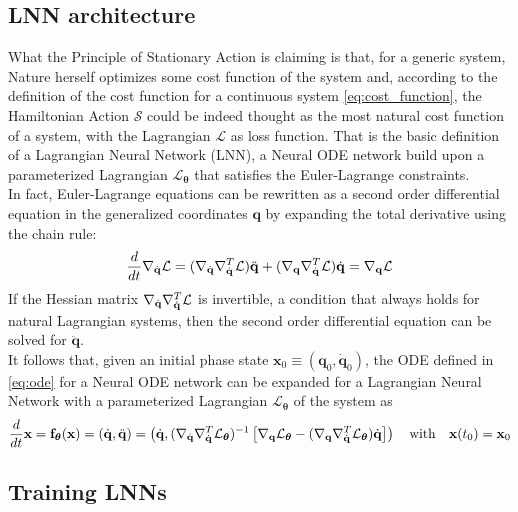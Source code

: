 \subsection{LNN architecture}
What the Principle of Stationary Action is claiming is that, for a generic system, Nature herself optimizes some cost function of the system and,
according to the definition of the cost function for a continuous system \eqref{eq:cost_function}, 
the Hamiltonian Action $\mathcal{S}$ could be indeed thought as the most natural cost function of a system, with the Lagrangian $\mathcal{L}$ as loss function.
That is the basic definition of a Lagrangian Neural Network (LNN), a Neural ODE network build upon a parameterized Lagrangian $\mathcal{L}_{\boldsymbol{\theta}}$ 
that satisfies the Euler-Lagrange constraints. \\
In fact, Euler-Lagrange equations can be rewritten as a second order differential equation in the generalized coordinates $\mathbf{q}$ by expanding the total derivative using the chain rule:
$$
\frac{d}{dt}\nabla_{\dot{\mathbf{q}}} {\cal L} 
= (\nabla_{\dot{\mathbf{q}}} \nabla_{\dot{\mathbf{q}}}^T {\cal L}) \ddot{\mathbf{q}} + (\nabla_\mathbf{q} \nabla_{\dot{\mathbf{q}}}^T {\cal L}) \dot{\mathbf{q}} 
= \nabla_\mathbf{q} {\cal L} 
$$
If the Hessian matrix $\nabla_{\dot{\mathbf{q}}} \nabla_{\dot{\mathbf{q}}}^T {\cal L}$ is invertible, 
a condition that always holds for natural Lagrangian systems, then the second order differential equation can be solved for $\ddot{\mathbf{q}}$. \\
It follows that, given an initial phase state $\mathbf{x}_0 \equiv (\mathbf{q}_0, \dot{\mathbf{q}}_0)$, 
the ODE defined in \eqref{eq:ode} for a Neural ODE network can be expanded for a Lagrangian Neural Network 
with a parameterized Lagrangian $\mathcal{L}_{\boldsymbol{\theta}}$ of the system as
\begin{equation}
    \frac{d}{dt}\mathbf{x} = \mathbf{f}_{\boldsymbol{\theta}}(\mathbf{x}) = \left( \dot{\mathbf{q}}, \ddot{\mathbf{q}} \right) = \left( \dot{\mathbf{q}}, (\nabla_{\dot{\mathbf{q}}} \nabla_{\dot{\mathbf{q}}}^T \mathcal{L}_{\boldsymbol{\theta}})^{-1} \left[ \nabla_\mathbf{q} \mathcal{L}_{\boldsymbol{\theta}} - (\nabla_\mathbf{q} \nabla_{\dot{\mathbf{q}}}^T \mathcal{L}_{\boldsymbol{\theta}}) \dot{\mathbf{q}} \right] \right)
    \quad \text{with} \quad \mathbf{x}(t_0) = \mathbf{x}_0
\end{equation}

\subsection{Training LNNs}